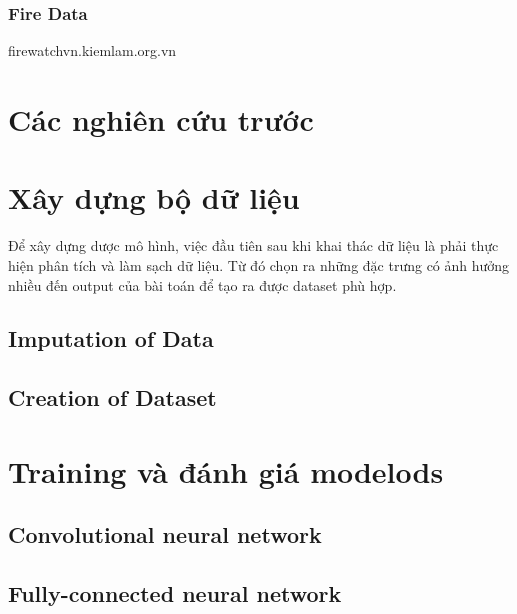 \documentclass{article}
\begin{document}
\subsubsection{Fire Data}
firewatchvn.kiemlam.org.vn



\section{Các nghiên cứu trước}



\section{Xây dựng bộ dữ liệu}

\qquad Để xây dựng dược mô hình, việc đầu tiên sau khi khai thác dữ liệu là phải thực hiện phân tích và làm sạch dữ liệu. Từ đó chọn ra những đặc trưng có ảnh hưởng nhiều đến output của bài toán để tạo ra được dataset phù hợp.

\subsection{Imputation of Data}
\subsection{Creation of Dataset}



\section{Training và đánh giá modelods}

\subsection{Convolutional neural network}
\subsection{Fully-connected neural network}
\end{document}
